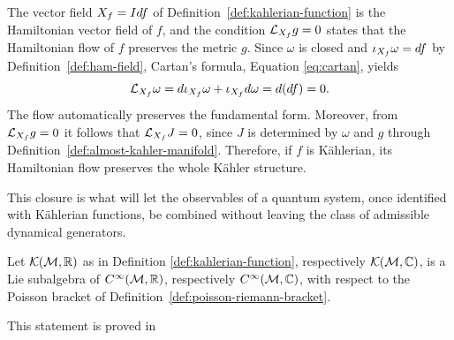 \begin{remark}
	\label{rem:kahlerian-hamiltonian-flow}
	The vector field $X_{f}=Idf$ of Definition~\ref{def:kahlerian-function}
	is the Hamiltonian vector field of $f$, and the condition
	$\mathcal{L}_{\Ham{f}}g=0$ states that the Hamiltonian flow of $f$ preserves the
	metric $g$. Since $\omega$ is closed and $\iota_{X_{f}}\omega=df$ by
	Definition~\ref{def:ham-field}, Cartan's formula, Equation \eqref{eq:cartan}, yields $$\mathcal{L}_{\Ham{f}}\omega=d\iota_{\Ham{f}}\omega+\iota_{\Ham{f}}d\omega=d(df)=0.$$ The flow automatically preserves the fundamental form. Moreover, from $\mathcal{L}_{\Ham{f}}g=0$ it follows that $\mathcal{L}_{\Ham{f}}J=0$, since $J$ is determined by $\omega$ and $g$ through Definition~\ref{def:almost-kahler-manifold}. Therefore, if $f$ is Kählerian, its Hamiltonian flow preserves the whole Kähler structure.
\end{remark}

\noindent This closure is what will let the observables of a quantum system, once identified with Kählerian functions, be combined without leaving the class of admissible dynamical generators.

\begin{proposition}
	\label{prop:kahlerian-lie-subalgebra}
	Let $\mathcal{K}(\mathcal{M},\R)$ as in Definition \ref{def:kahlerian-function}, respectively $\mathcal{K}(\mathcal{M},\C)$, is a Lie subalgebra of $C^\infty(\mathcal{M},\R)$, respectively $C^\infty(\mathcal{M},\C)$, with respect to the Poisson bracket of Definition~\ref{def:poisson-riemann-bracket}. 
\end{proposition}

\noindent This statement is proved in \cite[p.2892]{cirelliQuantumMechanicsInfinitedimensional1990}

